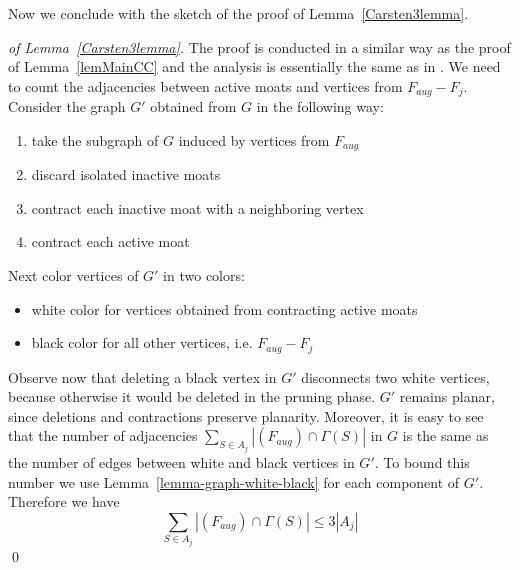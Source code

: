 Now we conclude with the sketch of the proof of Lemma~\ref{Carsten3lemma}.
\begin{proof}[of Lemma~\ref{Carsten3lemma}]
The proof is conducted in a similar way as the proof of Lemma~\ref{lemMainCC} and the analysis is essentially the same as in \cite{Moldenhauer}.
We need to count the adjacencies between active moats and vertices from $F_{aug} - F_j$. Consider the graph $G'$ obtained from $G$ in the following way:
\begin{enumerate}
	\item take the subgraph of $G$ induced by vertices from $F_{aug}$
	\item discard isolated inactive moats
	\item contract each inactive moat with a neighboring vertex 
	\item contract each active moat
\end{enumerate}
Next color vertices of $G'$ in two colors:
\begin{itemize}
	\item white color for vertices obtained from contracting active moats
	\item black color for all other vertices, i.e. $F_{aug} - F_j$
\end{itemize}
Observe now that deleting a black vertex in $G'$ disconnects two white vertices, because otherwise it would be deleted in the pruning phase. $G'$ remains planar, since deletions and contractions preserve planarity. Moreover, it is easy to see that the number of adjacencies $\sum_{S\in{A_j}}|(F_{aug}) \cap \Gamma(S)|$ in $G$ is the same as the number of edges between white and black vertices in $G'$. To bound this number we use Lemma~\ref{lemma-graph-white-black} for each component of $G'$. Therefore we have $$\sum_{S\in{A_j}}|(F_{aug}) \cap \Gamma(S)| \leq 3|A_j|$$ \qed
\end{proof}
